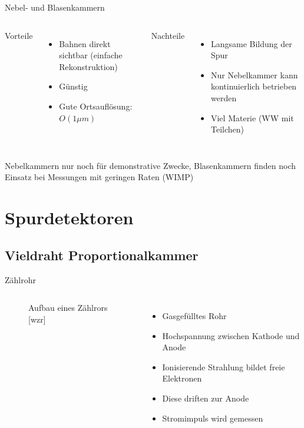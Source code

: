 \documentclass{beamer}
\begin{document}
\begin{frame}{Nebel- und Blasenkammern}
    \begin{columns}[T]
			Vorteile		
			\begin{itemize}
			  \item Bahnen direkt sichtbar (einfache Rekonstruktion)
			  \item Günstig
			  \item Gute Ortsauflösung: $O(1 \mu m)$
			\end{itemize}	
	    	Nachteile
	    	\begin{itemize}
			  \item Langsame Bildung der Spur
			  \item Nur Nebelkammer kann kontinuierlich betrieben werden
			  \item Viel Materie (WW mit Teilchen)
			\end{itemize}
    \end{columns}
    \vspace{1cm}
    Nebelkammern nur noch für demonstrative Zwecke, Blasenkammern finden noch
    Einsatz bei Messungen mit geringen Raten (WIMP)
\end{frame}

\section{Spurdetektoren}


\subsection{Vieldraht Proportionalkammer}


\begin{frame}{Zählrohr}
    \begin{columns}[T]
    
			\begin{figure}[htbp]
			  \centering
			  
			  \caption{Aufbau eines Zählrors [wzr]}
			\end{figure}
			
	    	\begin{itemize}
	    	  \item Gasgefülltes Rohr
			  \item Hochspannung zwischen Kathode und Anode
			  \item Ionisierende Strahlung bildet freie Elektronen
			  \item Diese driften zur Anode	
			  \item Stromimpuls wird gemessen
			\end{itemize}
    \end{columns}
\end{frame}
\end{document}
